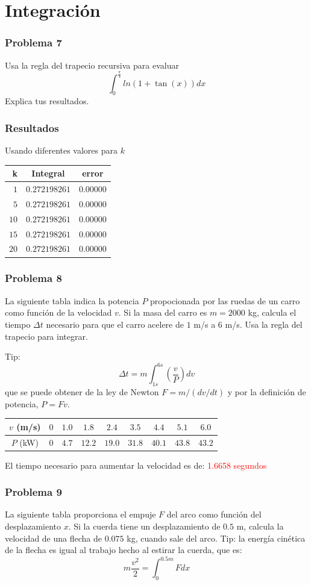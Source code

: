 \section{Integración}
\begin{frame}
\frametitle{Problema 7}
Usa la regla del trapecio recursiva para evaluar
\[ \int_{0}^{\frac{\pi}{4}} ln(1 + \tan(x)) dx\]
Explica tus resultados.
\end{frame}
\begin{frame}
\frametitle{Resultados}
Usando diferentes valores para $k$
\begin{center}
\begin{tabular}{r | c | c}
k &  Integral & error \\ \hline
$1$ & $0.272198261$ & $0.00000$ \\ \hline
$5$ & $0.272198261$ & $0.00000$ \\ \hline
$10$ & $0.272198261$ & $0.00000$ \\ \hline
$15$ & $0.272198261$ & $0.00000$ \\ \hline
$20$ & $0.272198261$ & $0.00000$
\end{tabular}
\end{center}
\end{frame}
\begin{frame}
\frametitle{Problema 8}
La siguiente tabla indica la potencia $P$ propocionada por las ruedas de un carro como función de la velocidad $v$. Si la masa del carro es $m=2000$ kg, calcula el tiempo $\Delta t$ necesario para que el carro acelere de $1$ m/s a $6$ m/s. Usa la regla del trapecio para integrar.
\end{frame}
\begin{frame}
Tip:
\[ \Delta t = m \int_{1s}^{6s} \left( \dfrac{v}{P} \right) dv\]
que se puede obtener de la ley de Newton $F= m/(dv/dt)$ y por la definición de potencia, $P=Fv$.
\begin{center}
\begin{tabular}{c | c | c | c | c | c | c | c | c}
$v$ (m/s) & $0$ & $1.0$ & $1.8$ & $2.4$ & $3.5$ & $4.4$ & $5.1$ & $6.0$ \\ \hline
$P$ (kW)  & $0$ & $4.7$ & $12.2$ & $19.0$ & $31.8$ & $40.1$ & $43.8$ & $43.2$ 
\end{tabular}
\end{center}
\pause
El tiempo necesario para aumentar la velocidad es de: \textcolor{red}{1.6658 segundos}
\end{frame}
\begin{frame}
\frametitle{Problema 9}
La siguiente tabla proporciona el empuje $F$ del arco como función del desplazamiento $x$. Si la cuerda tiene un desplazamiento de $0.5$ m, calcula la velocidad de una flecha de $0.075$ kg, cuando sale del arco. Tip: la energía cinética de la flecha es igual al trabajo hecho al estirar la cuerda, que es:
\[ m \dfrac{v^{2}}{2} = \int_{0}^{0.5m} F dx\]
\end{frame}

